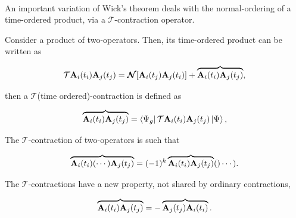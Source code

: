 \blanky \\
An important variation of Wick's theorem deals with the normal-ordering of a time-ordered product, via a $\bm{\mathcal{T}}$-contraction operator. 

\begin{theorem}

Consider a product of two-operators. Then, its time-ordered product can be written as 

\begin{equation}
    \mathcal{T} {{\bf A}}_{i}(t_i) {{\bf A}}_{j}(t_j) = \bm{\mathcal{N}}[{{\bf A}}_{i}(t_j) {{\bf A}}_{j}(t_i)] + \overbrace{{{\bf A}}_{i}(t_i) {{\bf A}}_{j}(t_j)}, 
\end{equation}

then a $\bm{\mathcal{T}}$(time ordered)-contraction is defined as 

\begin{equation}
    \overbrace{{{\bf A}}_{i}(t_i) {{\bf A}}_{j}(t_j)} = \bra{\Psi_g} \mathcal{T} {{\bf A}}_{i}(t_i) {{\bf A}}_{j}(t_j) \ket{\Psi},
\end{equation}

\end{theorem}

\begin{remark}
    The $\bm{\mathcal{T}}$-contraction of two-operators is such that 
    
    \begin{equation}
        \overbrace{{{\bf A}}_{i}(t_i) (\cdots ) {{\bf A}}_{j}(t_j)} = (-1)^k \overbrace{{{\bf A}}_{i}(t_i) {{\bf A}}_{j}(t_j)} ()\cdots).
    \end{equation}
\end{remark}

\begin{remark}
    The $\bm{\mathcal{T}}$-contractions have a new property, not shared by ordinary contractions,
    
    \begin{equation}
        \overbrace{{{\bf A}}_{i}(t_i) {{\bf A}}_{j}(t_j)} = - \overbrace{{{\bf A}}_{j}(t_j) {{\bf A}}_{i}(t_i)}.
    \end{equation}
\end{remark}

